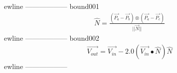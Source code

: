 ewline
------------------
\newline
bound001\newline
\begin{equation*}
 \begin{split}
 \hat{N}=\frac{\left(\vec{P_a}-\vec{P_b}\right)\otimes\left(\vec{P_a}-\vec{P_c}\right)}{||\vec{N}||}\end{split}
 \end{equation*}
ewline
------------------
\newline
bound002\newline
\begin{equation*}
 \begin{split}
 \vec{V_{out}} = \vec{V_{in}} - 2.0(\vec{V_{in}}\bullet\hat{N})\hat{N}\end{split}
 \end{equation*}
ewline
------------------
